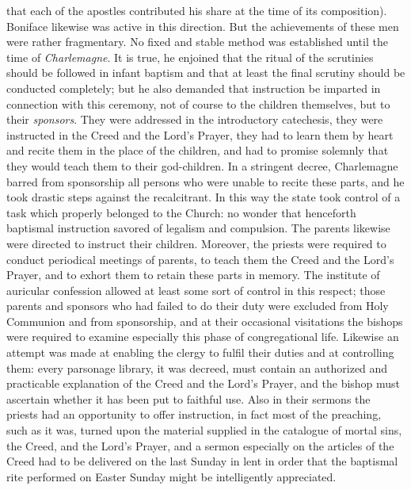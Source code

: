 that each of the apostles contributed his share at the time of its composition). Boniface likewise was active in this direction. But the achievements of these men were rather fragmentary. No fixed and stable method was established until the time of \emph{Charlemagne}. It is true, he enjoined that the ritual of the scrutinies should be followed in infant baptism and that at least the final scrutiny should be conducted completely; but he also demanded that instruction be imparted in connection with this ceremony, not of course to the children themselves, but to their \emph{sponsors}. They were addressed in the introductory catechesis, they were instructed in the Creed and the Lord’s Prayer, they had to learn them by heart and recite them in the place of the children, and had to promise solemnly that they would teach them to their god-children. In a stringent decree, Charlemagne barred from sponsorship all persons who were unable to recite these parts, and he took drastic steps against the recalcitrant. In this way the state took control of a task which properly belonged to the Church: no wonder that henceforth baptismal instruction savored of legalism and compulsion. The parents likewise were directed to instruct their children. Moreover, the priests were required to conduct periodical meetings of parents, to teach them the Creed and the Lord’s Prayer, and to exhort them to retain these parts in memory. The institute of auricular confession allowed at least some sort of control in this respect; those parents and sponsors who had failed to do their duty were excluded from Holy Communion and from sponsorship, and at their occasional visitations the bishops were required to examine especially this phase of congregational life. Likewise an attempt was made at enabling the clergy to fulfil their duties and at controlling them: every parsonage library, it was decreed, must contain an authorized and practicable explanation of the Creed and the Lord’s Prayer, and the bishop must ascertain whether it has been
put to faithful use. Also in their sermons the priests had an opportunity to offer instruction, in fact most of the preaching, such as it was, turned upon the material supplied in the catalogue of mortal sins, the Creed, and the Lord’s Prayer, and a sermon especially on the articles of the Creed had to be delivered on the last Sunday in lent in order that the baptismal rite performed on Easter Sunday might be intelligently appreciated.

